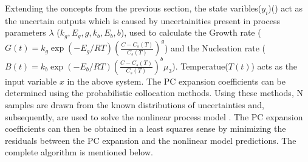 \documentclass[3p,times,authoryear]{elsarticle}
\begin{document}
Extending the concepts from the previous section, the state varibles($y_{i}$)() act as the uncertain outputs which is caused by uncertainities present in process parameters $\lambda$ ($k_{g}, E_{g}, g, k_{b}, E_{b}, b$), used to calculate the Growth rate ($G(t) = k_{g}\exp{\left(-E_{g}/RT \right)}\left(\frac{C - C_{s}(T)}{C_{s}(T)}\right)^{g}$) and the Nucleation rate ($B(t) = k_{b}\exp{\left(-E_{b}/RT \right)}\left(\frac{C - C_{s}(T)}{C_{s}(T)}\right)^{b}\mu_{3}$). Temperatue($T(t)$) acts as the input variable $x$ in the above system. The PC expansion coefficients can be determined using the probabilistic collocation methods. Using these methods, N samples are drawn from the known distributions of uncertainties and, subsequently, are used to solve the nonlinear process model . The PC expansion coefficients can then be obtained in a least squares sense by minimizing the residuals between the PC expansion and the nonlinear model predictions. The complete algorithm is mentioned below.
\end{document}
